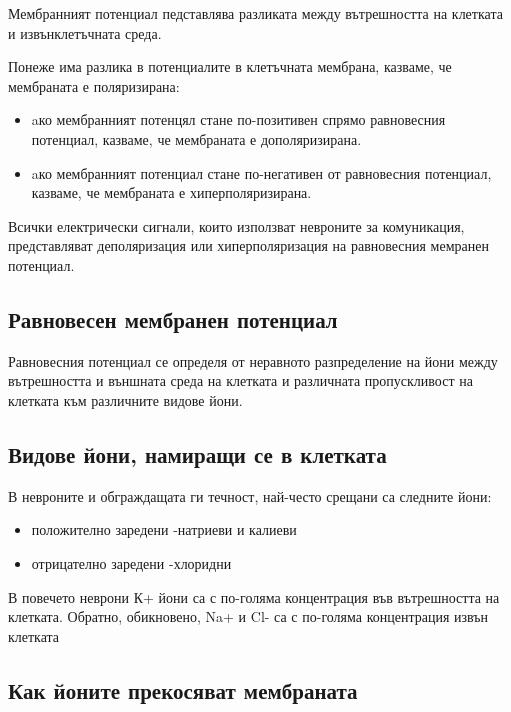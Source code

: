 \documentclass{article}
\begin{document}
Мембранният потенциал педставлява разликата между вътрешността на клетката и извънклетъчната среда.

Понеже има разлика в потенциалите в клетъчната мембрана, казваме, че мембраната е поляризирана:
\begin{itemize}
  \item aко мембранният потенцял стане по-позитивен спрямо равновесния потенциал, казваме, че мембраната е дополяризирана.
  \item aко мембранният потенциал стане по-негативен от равновесния потенциал, казваме, че мембраната е хиперполяризирана.
\end{itemize}

Всички електрически сигнали, които използват невроните за комуникация, представляват деполяризация или хиперполяризация на равновесния мемранен потенциал.

\vspace{5mm} %
\subsection{Равновесен мембранен потенциал}

Равновесния потенциал се определя от неравното разпределение на йони между вътрешността и външната среда на клетката и различната пропускливост на клетката към различните видове йони.

\vspace{5mm} %
\subsection{Видове йони, намиращи се в клетката}

В невроните и обграждащата ги течност, най-често срещани са следните йони:
\begin{itemize}
  \item положително заредени -натриеви и калиеви
  \item отрицателно заредени -хлоридни
\end{itemize}

В повечето неврони К+ йони са с по-голяма концентрация във вътрешността на клетката. Обратно, обикновено, Na+ и Cl- са с по-голяма концентрация извън клетката

\vspace{5mm} %
\subsection{Как йоните прекосяват мембраната}
\end{document}
